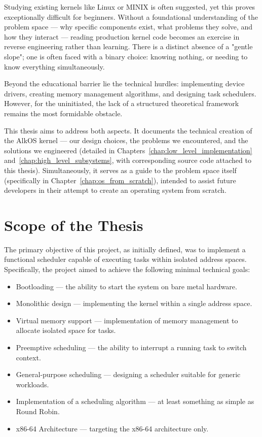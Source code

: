 \documentclass[a4paper,10pt,twoside]{report}
\theoremstyle{definition}
\begin{document}
Studying existing kernels like Linux or MINIX is often suggested, yet this proves exceptionally difficult for beginners. Without a foundational understanding of the problem space --- why specific components exist, what problems they solve, and how they interact --- reading production kernel code becomes an exercise in reverse engineering rather than learning. There is a distinct absence of a "gentle slope"; one is often faced with a binary choice: knowing nothing, or needing to know everything simultaneously.

Beyond the educational barrier lie the technical hurdles: implementing device drivers, creating memory management algorithms, and designing task schedulers. However, for the uninitiated, the lack of a structured theoretical framework remains the most formidable obstacle.

This thesis aims to address both aspects. It documents the technical creation of the AlkOS kernel --- our design choices, the problems we encountered, and the solutions we engineered (detailed in Chapters~\ref{chap:low_level_implementation} and~\ref{chap:high_level_subsystems}, with corresponding source code attached to this thesis). Simultaneously, it serves as a guide to the problem space itself (specifically in Chapter~\ref{chap:os_from_scratch}), intended to assist future developers in their attempt to create an operating system from scratch.

\section{Scope of the Thesis}
\label{subsec:scope}

The primary objective of this project, as initially defined, was to implement a functional scheduler capable of executing tasks within isolated address spaces. Specifically, the project aimed to achieve the following minimal technical goals:

\begin{itemize} 
    \item Bootloading --- the ability to start the system on bare metal hardware. 
    \item Monolithic design --- implementing the kernel within a single address space. 
    \item Virtual memory support --- implementation of memory management to allocate isolated space for tasks. 
    \item Preemptive scheduling --- the ability to interrupt a running task to switch context. 
    \item General-purpose scheduling --- designing a scheduler suitable for generic workloads. 
    \item Implementation of a scheduling algorithm --- at least something as simple as Round Robin. 
    \item x86-64 Architecture --- targeting the x86-64 architecture only.
\end{itemize}
\end{document}
